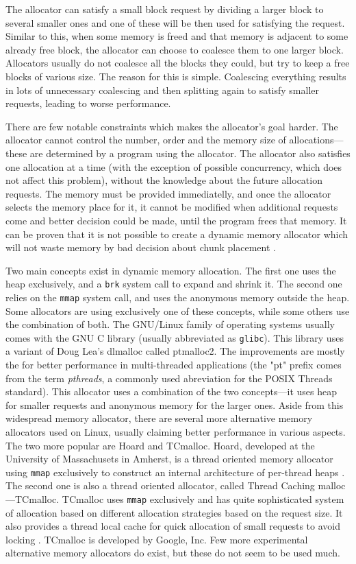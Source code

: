 The allocator can satisfy a small block request by dividing a larger block to several smaller ones and one of these will be then used for satisfying the request. Similar to this, when some memory is freed and that memory is adjacent to some already free block, the allocator can choose to coalesce them to one larger block. Allocators usually do not coalesce all the blocks they could, but try to keep a free blocks of various size. The reason for this is simple. Coalescing everything results in lots of unnecessary coalescing and then splitting again to satisfy smaller requests, leading to worse performance.  

There are few notable constraints which makes the allocator's goal harder. The allocator cannot control the number, order and the memory size of allocations---these are determined by a program using the allocator. The allocator also satisfies one allocation at a time (with the exception of possible concurrency, which does not affect this problem), without the knowledge about the future allocation requests. The memory must be provided immediatelly, and once the allocator selects the memory place for it, it cannot be modified when additional requests come and better decision could be made, until the program frees that memory. It can be proven that it is not possible to create a dynamic memory allocator which will not waste memory by bad decision about chunk placement \cite{DSAsurvey}.

Two main concepts exist in dynamic memory allocation. The first one uses the heap exclusively, and a {\tt brk} system call to expand and shrink it. The second one relies on the {\tt mmap} system call, and uses the anonymous memory outside the heap. Some allocators are using exclusively one of these concepts, while some others use the combination of both. The GNU/Linux family of operating systems usually comes with the GNU C library (usually abbreviated as {\tt glibc}). This library uses a variant of Doug Lea's dlmalloc called ptmalloc2. The improvements are mostly the for better performance in multi-threaded applications (the "pt" prefix comes from the term {\em pthreads}, a commonly used abreviation for the POSIX Threads standard). This allocator uses a combination of the two concepts---it uses heap for smaller requests and anonymous memory for the larger ones. Aside from this widespread memory allocator, there are several more alternative memory allocators used on Linux, usually claiming better performance in various aspects. The two more popular are Hoard and TCmalloc. Hoard, developed at the University of Massachusets in Amherst, is a thread oriented memory allocator using {\tt mmap} exclusively to construct an internal architecture of per-thread heaps \cite{allocators:hoard}. The second one is also a thread oriented allocator, called Thread Caching malloc---TCmalloc. TCmalloc uses {\tt mmap} exclusively and has quite sophisticated system of allocation based on different allocation strategies based on the request size. It also provides a thread local cache for quick allocation of small requests to avoid locking \cite{tcmalloc}. TCmalloc is developed by Google, Inc. Few more experimental alternative memory allocators do exist, but these do not seem to be used much.

